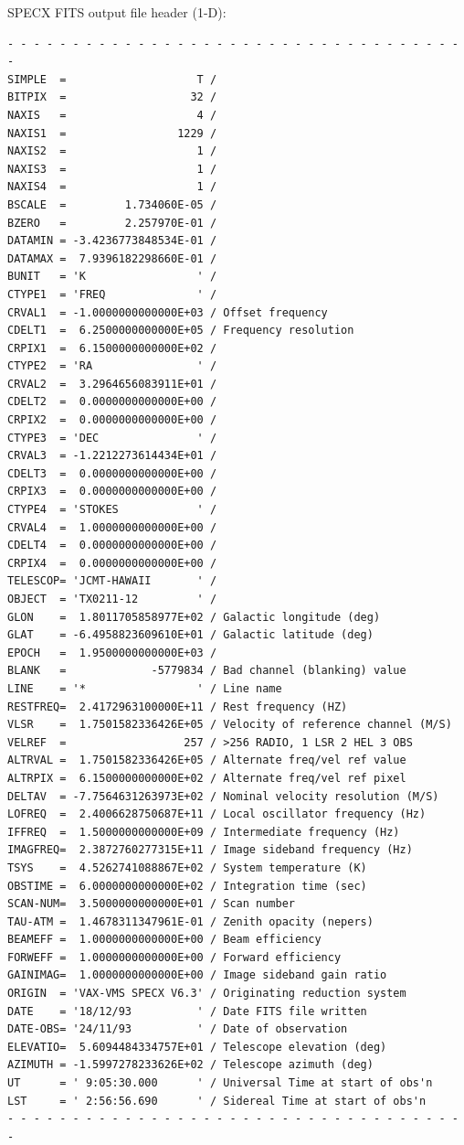 \documentclass[11pt,twoside]{report}
\begin{document}
SPECX FITS output file header (1-D):
\begin{verbatim}
- - - - - - - - - - - - - - - - - - - - - - - - - - - - - - - - - - - - 
SIMPLE  =                    T /
BITPIX  =                   32 /
NAXIS   =                    4 /
NAXIS1  =                 1229 /
NAXIS2  =                    1 /
NAXIS3  =                    1 /
NAXIS4  =                    1 /
BSCALE  =         1.734060E-05 /
BZERO   =         2.257970E-01 /
DATAMIN = -3.4236773848534E-01 /
DATAMAX =  7.9396182298660E-01 /
BUNIT   = 'K                 ' /
CTYPE1  = 'FREQ              ' /
CRVAL1  = -1.0000000000000E+03 / Offset frequency
CDELT1  =  6.2500000000000E+05 / Frequency resolution
CRPIX1  =  6.1500000000000E+02 /
CTYPE2  = 'RA                ' /
CRVAL2  =  3.2964656083911E+01 /
CDELT2  =  0.0000000000000E+00 /
CRPIX2  =  0.0000000000000E+00 /
CTYPE3  = 'DEC               ' /
CRVAL3  = -1.2212273614434E+01 /
CDELT3  =  0.0000000000000E+00 /
CRPIX3  =  0.0000000000000E+00 /
CTYPE4  = 'STOKES            ' /
CRVAL4  =  1.0000000000000E+00 /
CDELT4  =  0.0000000000000E+00 /
CRPIX4  =  0.0000000000000E+00 /
TELESCOP= 'JCMT-HAWAII       ' /
OBJECT  = 'TX0211-12         ' /
GLON    =  1.8011705858977E+02 / Galactic longitude (deg)
GLAT    = -6.4958823609610E+01 / Galactic latitude (deg)
EPOCH   =  1.9500000000000E+03 /
BLANK   =             -5779834 / Bad channel (blanking) value
LINE    = '*                 ' / Line name
RESTFREQ=  2.4172963100000E+11 / Rest frequency (HZ)
VLSR    =  1.7501582336426E+05 / Velocity of reference channel (M/S)
VELREF  =                  257 / >256 RADIO, 1 LSR 2 HEL 3 OBS                  
ALTRVAL =  1.7501582336426E+05 / Alternate freq/vel ref value
ALTRPIX =  6.1500000000000E+02 / Alternate freq/vel ref pixel
DELTAV  = -7.7564631263973E+02 / Nominal velocity resolution (M/S)
LOFREQ  =  2.4006628750687E+11 / Local oscillator frequency (Hz)
IFFREQ  =  1.5000000000000E+09 / Intermediate frequency (Hz)
IMAGFREQ=  2.3872760277315E+11 / Image sideband frequency (Hz)
TSYS    =  4.5262741088867E+02 / System temperature (K)
OBSTIME =  6.0000000000000E+02 / Integration time (sec)
SCAN-NUM=  3.5000000000000E+01 / Scan number
TAU-ATM =  1.4678311347961E-01 / Zenith opacity (nepers)
BEAMEFF =  1.0000000000000E+00 / Beam efficiency
FORWEFF =  1.0000000000000E+00 / Forward efficiency
GAINIMAG=  1.0000000000000E+00 / Image sideband gain ratio
ORIGIN  = 'VAX-VMS SPECX V6.3' / Originating reduction system
DATE    = '18/12/93          ' / Date FITS file written
DATE-OBS= '24/11/93          ' / Date of observation
ELEVATIO=  5.6094484334757E+01 / Telescope elevation (deg)
AZIMUTH = -1.5997278233626E+02 / Telescope azimuth (deg)
UT      = ' 9:05:30.000      ' / Universal Time at start of obs'n
LST     = ' 2:56:56.690      ' / Sidereal Time at start of obs'n
- - - - - - - - - - - - - - - - - - - - - - - - - - - - - - - - - - - - 
\end{verbatim}
\end{document}
